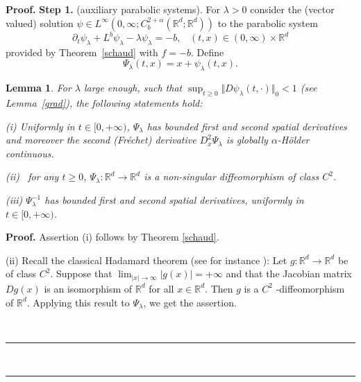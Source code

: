 \documentclass[a4paper,11pt]{article}
\newtheorem{lemma}[theorem]{Lemma}
\newenvironment{proof}[1][Proof]{\textbf{#1.} }{\ \rule{0.5em}{0.5em}}
\begin{document}
\begin{proof}
\textbf{Step 1.} (auxiliary parabolic systems). For $\lambda >0$ consider
the (vector valued) solution $\psi \in L^{\infty }\left( 0,\infty
;C_{b}^{2+\alpha }({\mathbb{R}}^{d};{\mathbb{R}}^{d})\right) $ to the
parabolic system
\begin{equation}
\partial _{t}\psi _{\lambda }+L^{b}\psi _{\lambda }-\lambda \psi _{\lambda
}=-b,\;\;\;(t,x)\in (0,\infty )\times {\mathbb{R}}^{d}  \label{pde}
\end{equation}
provided by Theorem~\ref{schaud} with $f=-b$. Define
\begin{equation*}
\Psi _{\lambda }(t,x)=x+\psi _{\lambda }(t,x).
\end{equation*}

\begin{lemma}
\label{diff} For $\lambda $ large enough, such that $\sup_{t\geq 0}\Vert
D\psi _{\lambda }(t,\cdot )\Vert _{0}<1$ (see Lemma~\ref{grad}), the
following statements hold:

{\vskip2mm \noindent } (i) Uniformly in $t\in \lbrack 0,+\infty )$, $\Psi
_{\lambda }$ has bounded first and second spatial derivatives and moreover
the second (Fr\'{e}chet) derivative $D_{x}^{2}\Psi _{\lambda }$ is globally $%
\alpha $-H\"{o}lder continuous.

{\vskip2mm \noindent } (ii) \ for any $t\geq 0$, $\Psi _{\lambda }:\mathbb{R}%
^{d}\rightarrow \mathbb{R}^{d}$ is a non-singular diffeomorphism of class $%
C^{2}$.

{\vskip2mm \noindent } (iii) $\Psi _{\lambda }^{-1}$ has bounded first and
second spatial derivatives, uniformly in $t\in \lbrack 0,+\infty )$.
\end{lemma}

\begin{proof}
Assertion (i) follows by Theorem \ref{schaud}.

\vskip2mm (ii) Recall the classical Hadamard theorem (see for instance
\cite[page 330]{protter}): Let $g:\mathbb{R}^{d}\rightarrow \mathbb{R}^{d}$
be of class $C^{2}.$ Suppose that $\lim_{|x|\rightarrow \infty
}|g(x)|=+\infty $ and that the Jacobian matrix $Dg(x)$ is an isomorphism of $%
\mathbb{R}^{d}$ for all $x\in \mathbb{R}^{d}$. Then $g$ is a $C^{2}$%
-diffeomorphism of $\mathbb{R}^{d}$. Applying this result to $\Psi _{\lambda
}$, we get the assertion.


\end{proof}
\end{proof}
\end{document}
